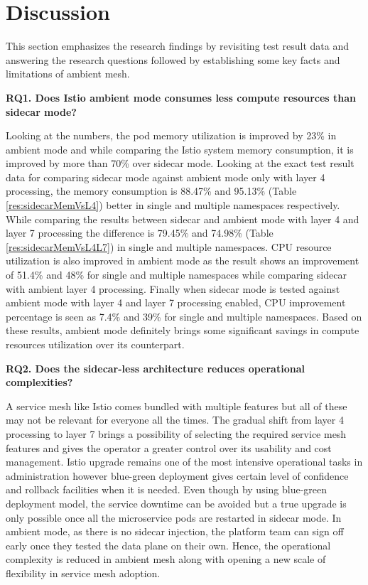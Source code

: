 \section{Discussion}
This section emphasizes the research findings by revisiting test result data and answering the research questions followed by establishing some key facts and limitations of ambient mesh.

\textbf{RQ1. Does Istio ambient mode consumes less compute resources than sidecar mode?}

Looking at the numbers, the pod memory utilization is improved by 23\% in ambient mode and while comparing the Istio system memory consumption, it is improved by more than 70\% over sidecar mode. Looking at the exact test result data for comparing sidecar mode against ambient mode only with layer 4 processing, the memory consumption is 88.47\% and 95.13\% (Table \ref{res:sidecarMemVsL4}) better in single and multiple namespaces respectively. While comparing the results between sidecar and ambient mode with layer 4 and layer 7 processing the difference is 79.45\% and 74.98\% (Table \ref{res:sidecarMemVsL4L7}) in single and multiple namespaces. CPU resource utilization is also improved in ambient mode as the result shows an improvement of 51.4\% and 48\% for single and multiple namespaces while comparing sidecar with ambient layer 4 processing. Finally when sidecar mode is tested against ambient mode with layer 4 and layer 7 processing enabled, CPU improvement percentage is seen as 7.4\% and 39\% for single and multiple namespaces. Based on these results, ambient mode definitely brings some significant savings in compute resources utilization over its counterpart.

\textbf{RQ2. Does the sidecar-less architecture reduces operational complexities?}

A service mesh like Istio comes bundled with multiple features but all of these may not be relevant for everyone all the times. The gradual shift from layer 4 processing to layer 7 brings a possibility of selecting the required service mesh features and gives the operator a greater control over its usability and cost management. Istio upgrade remains one of the most intensive operational tasks in administration however blue-green deployment gives certain level of confidence and rollback facilities when it is needed. Even though by using blue-green deployment model, the service downtime can be avoided but a true upgrade is only possible once all the microservice pods are restarted in sidecar mode. In ambient mode, as there is no sidecar injection, the platform team can sign off early once they tested the data plane on their own. Hence, the operational complexity is reduced in ambient mesh along with opening a new scale of flexibility in service mesh adoption.

